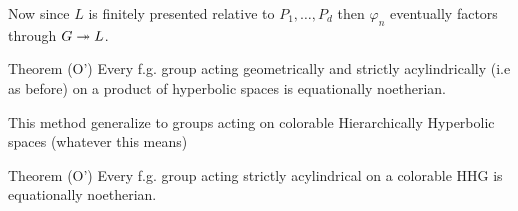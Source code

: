 \documentclass[handout]{beamer}[10]
\begin{document}
\begin{frame}
    Now since $L$ is finitely presented relative to $P_1, \ldots ,P_d$ then $\varphi_n$ eventually factors through $G\twoheadrightarrow L$.

    \begin{block}{Theorem (O')}
        Every f.g. group acting  geometrically and strictly acylindrically (i.e as before) on a product of hyperbolic spaces is equationally noetherian.
    \end{block}

    This method generalize to groups acting on colorable Hierarchically Hyperbolic spaces (whatever this means)
    \begin{block}{Theorem (O')}
        Every f.g. group acting strictly acylindrical on a colorable HHG is equationally noetherian.
    \end{block}


\end{frame}
\end{document}
